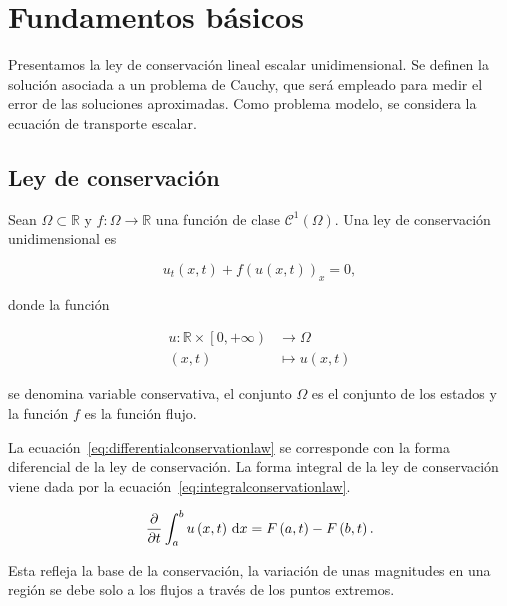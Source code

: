 \chapter{Fundamentos básicos}

Presentamos la ley de conservación lineal escalar unidimensional.
Se definen la solución asociada a un problema de Cauchy, que será
empleado para medir el error de las soluciones aproximadas.
Como problema modelo, se considera la ecuación de transporte escalar.

\section{Ley de conservación}

\begin{definition}
  Sean
  \begin{math}
    \Omega\subset
    \mathbb{R}
  \end{math}
  y
  \begin{math}
    f\colon\Omega\to
    \mathbb{R}
  \end{math}
  una
  función de clase
  \begin{math}
    \mathcal{C}^{1}
    \left(\Omega\right)
  \end{math}.
  Una ley de conservación unidimensional es

  \begin{equation}\label{eq:differentialconservationlaw}
    u_{t}
    \left(x,t\right)+
    {f\left(u\left(x,t\right)\right)}_{x}=
    0,
  \end{equation}

  donde la función

  \begin{align*}
    u\colon\mathbb{R}\times
    \left[0,+\infty\right) &
    \longrightarrow
    \Omega                   \\
    \left(x,t\right)       &
    \longmapsto
    u\left(x,t\right)
  \end{align*}

  se denomina variable conservativa, el conjunto $\Omega$ es el
  conjunto de los estados y la función $f$ es la función flujo.
\end{definition}

\begin{remark}
  La ecuación~\eqref{eq:differentialconservationlaw} se corresponde
  con la forma diferencial de la ley de conservación.
  La forma integral de la ley de conservación viene dada por la
  ecuación~\eqref{eq:integralconservationlaw}.

  \begin{equation}\label{eq:integralconservationlaw}
    \diffp{}{t}
    \int_{a}^{b}
    u\left(x,t\right)\dl x=
    F\left(a,t\right)-
    F\left(b,t\right).
  \end{equation}

  Esta refleja la base de la conservación, la variación de unas
  magnitudes en una región se debe solo a los flujos a través de los
  puntos extremos.
\end{remark}

